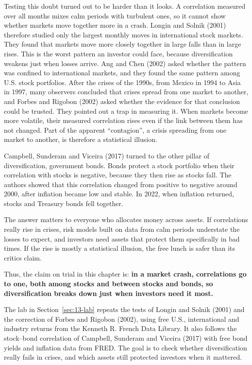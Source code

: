 Testing this doubt turned out to be harder than it looks. A correlation measured over all months mixes calm periods with turbulent ones, so it cannot show whether markets move together more in a crash. Longin and Solnik (2001) therefore studied only the largest monthly moves in international stock markets. They found that markets move more closely together in large falls than in large rises. This is the worst pattern an investor could face, because diversification weakens just when losses arrive. Ang and Chen (2002) asked whether the pattern was confined to international markets, and they found the same pattern among U.S. stock portfolios. After the crises of the 1990s, from Mexico in 1994 to Asia in 1997, many observers concluded that crises spread from one market to another, and Forbes and Rigobon (2002) asked whether the evidence for that conclusion could be trusted. They pointed out a trap in measuring it. When markets become more volatile, their measured correlation rises even if the link between them has not changed. Part of the apparent ``contagion'', a crisis spreading from one market to another, is therefore a statistical illusion.

Campbell, Sunderam and Viceira (2017) turned to the other pillar of diversification, government bonds. Bonds protect a stock portfolio when their correlation with stocks is negative, because they then rise as stocks fall. The authors showed that this correlation changed from positive to negative around 2000, after inflation became low and stable. In 2022, when inflation returned, stocks and Treasury bonds fell together.


The answer matters to everyone who allocates money across assets. If correlations really rise in crises, risk models built on data from calm periods understate the losses to expect, and investors need assets that protect them specifically in bad times. If the rise is mostly a statistical illusion, the free lunch is safer than its critics claim. 


Thus, the claim on trial in this chapter is: \textbf{in a market crash, correlations go to one, both among stocks and between stocks and bonds, so diversification breaks down just when investors need it most.}

The lab in Section~\ref{sec:13-lab} repeats the tests of Longin and Solnik (2001) and the correction of Forbes and Rigobon (2002), using free U.S., international and industry returns from the Kenneth R. French Data Library. It also follows the stock--bond correlation of Campbell, Sunderam and Viceira (2017) with free bond yields and inflation data from FRED. The goal is to check whether diversification really fails in crises, and which assets still protected investors when it mattered.

